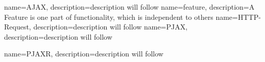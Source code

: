{
  name=AJAX,
  description={description will follow}
}
{
  name=feature,
  description={A Feature is one part of functionality, which is independent to others}
}
{
  name=HTTP-Request,
  description={description will follow}
}
{
  name=PJAX,
  description={description will follow}
}

{
  name=PJAXR,
  description={description will follow}
}